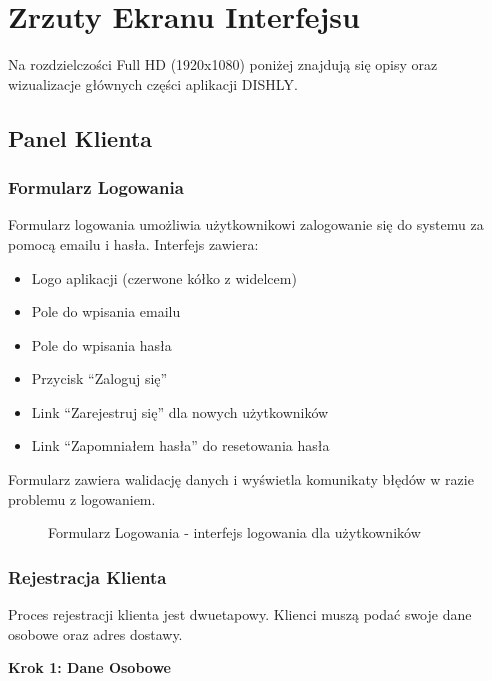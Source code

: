 \documentclass[12pt,a4paper,utf-8]{article}
\begin{document}
\newpage

\section{Zrzuty Ekranu Interfejsu}

Na rozdzielczości Full HD (1920x1080) poniżej znajdują się opisy oraz wizualizacje głównych części aplikacji DISHLY.

\subsection{Panel Klienta}

\subsubsection{Formularz Logowania}

Formularz logowania umożliwia użytkownikowi zalogowanie się do systemu za pomocą emailu i hasła. Interfejs zawiera:

\begin{itemize}
    \item Logo aplikacji (czerwone kółko z widelcem)
    \item Pole do wpisania emailu
    \item Pole do wpisania hasła
    \item Przycisk ``Zaloguj się''
    \item Link ``Zarejestruj się'' dla nowych użytkowników
    \item Link ``Zapomniałem hasła'' do resetowania hasła
\end{itemize}

Formularz zawiera walidację danych i wyświetla komunikaty błędów w razie problemu z logowaniem.

\begin{figure}[H]
    \centering
    \caption{Formularz Logowania  -  interfejs logowania dla użytkowników}
    \label{fig:login_form}
\end{figure}

\subsubsection{Rejestracja Klienta}

Proces rejestracji klienta jest dwuetapowy. Klienci muszą podać swoje dane osobowe oraz adres dostawy.

\textbf{Krok 1: Dane Osobowe}
\end{document}
